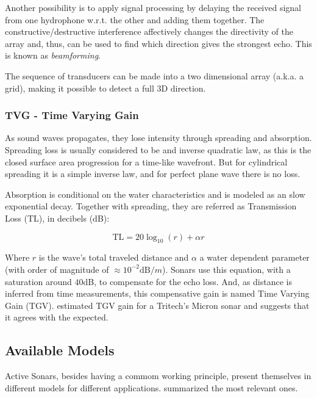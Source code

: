 
Another possibility is to apply signal processing by delaying the received
signal from one hydrophone w.r.t. the other and adding them together. The
constructive/destructive interference affectively changes the directivity of the
array and, thus, can be used to find which direction gives the strongest echo.
This is known as \textit{beamforming}.

The sequence of transducers can be made into a two dimensional array
(a.k.a. a grid), making it possible to detect a full 3D direction.

\subsubsection{TVG - Time Varying Gain}\label{sss:tvg}

As sound waves propagates, they lose intensity through spreading and absorption.
Spreading loss is usually considered to be and inverse quadratic
law\cite{Etter2013}, as this is the closed surface area progression for
a time-like wavefront. But for cylindrical spreading it is a simple inverse law,
and for perfect plane wave there is no loss.

Absorption is conditional on the water characteristics and is modeled as an
slow exponential decay. Together with spreading, they are referred as
Transmission Loss ($\text{TL}$), in decibels (dB):

\begin{equation*}
\text{TL} = 20\log_{10}(r) + \alpha r
\end{equation*}

Where $r$ is the wave's total traveled distance and $\alpha$ a water dependent
parameter (with order of magnitude of $\approx 10^{-2} \text{dB}/m$). Sonars use
this equation, with a saturation around $40$dB, to compensate for the echo
loss\cite{chu2006time}. And, as distance is inferred from time measurements,
this compensative gain is named Time Varying Gain (TGV). \citet{chew2013object}
estimated TGV gain for a Tritech's Micron sonar and suggests that it agrees with
the expected.


\subsection{Available Models}
\label{ss:avaible_models}
 
Active Sonars, besides having a commom working principle, present themselves in
different models for different applications. \citet{sonars:16} summarized the
most relevant ones.

